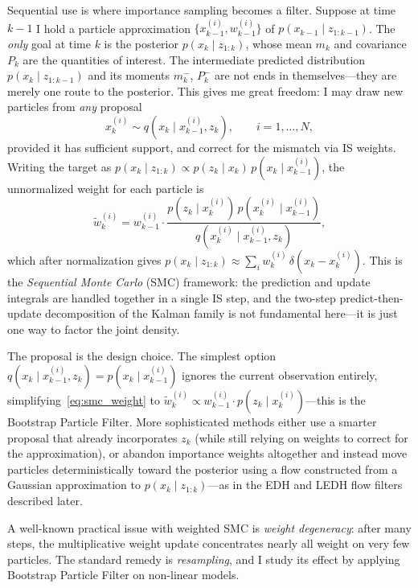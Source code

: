 \documentclass{article}
\begin{document}
Sequential use is where importance sampling becomes a filter. Suppose at time $k-1$ I hold a particle approximation $\{x_{k-1}^{(i)}, w_{k-1}^{(i)}\}$ of $p(x_{k-1} \mid z_{1:k-1})$. The \textit{only} goal at time $k$ is the posterior $p(x_k \mid z_{1:k})$, whose mean $m_k$ and covariance $P_k$ are the quantities of interest. The intermediate predicted distribution $p(x_k \mid z_{1:k-1})$ and its moments $m_k^-$, $P_k^-$ are not ends in themselves—they are merely one route to the posterior. This gives me great freedom: I may draw new particles from \textit{any} proposal
\begin{equation}
    x_k^{(i)} \sim q(x_k \mid x_{k-1}^{(i)}, z_k), \qquad i = 1, \ldots, N,
\end{equation}
provided it has sufficient support, and correct for the mismatch via IS weights. Writing the target as $p(x_k \mid z_{1:k}) \propto p(z_k \mid x_k)\, p(x_k \mid x_{k-1}^{(i)})$, the unnormalized weight for each particle is
\begin{equation}
    \tilde{w}_k^{(i)} = w_{k-1}^{(i)} \cdot \frac{p(z_k \mid x_k^{(i)})\, p(x_k^{(i)} \mid x_{k-1}^{(i)})}{q(x_k^{(i)} \mid x_{k-1}^{(i)}, z_k)},
    \label{eq:smc_weight}
\end{equation}
which after normalization gives $p(x_k \mid z_{1:k}) \approx \sum_i w_k^{(i)}\, \delta(x_k - x_k^{(i)})$. This is the \textit{Sequential Monte Carlo} (SMC) framework: the prediction and update integrals are handled together in a single IS step, and the two-step predict-then-update decomposition of the Kalman family is not fundamental here—it is just one way to factor the joint density.

The proposal is the design choice. The simplest option $q(x_k \mid x_{k-1}^{(i)}, z_k) = p(x_k \mid x_{k-1}^{(i)})$ ignores the current observation entirely, simplifying~\eqref{eq:smc_weight} to $\tilde{w}_k^{(i)} \propto w_{k-1}^{(i)} \cdot p(z_k \mid x_k^{(i)})$—this is the Bootstrap Particle Filter. More sophisticated methods either use a smarter proposal that already incorporates $z_k$ (while still relying on weights to correct for the approximation), or abandon importance weights altogether and instead move particles deterministically toward the posterior using a flow constructed from a Gaussian approximation to $p(x_k \mid z_{1:k})$—as in the EDH and LEDH flow filters described later.

A well-known practical issue with weighted SMC is \textit{weight degeneracy}: after many steps, the multiplicative weight update concentrates nearly all weight on very few particles. The standard remedy is \textit{resampling}, and I study its effect by applying Bootstrap Particle Filter on non-linear models.
\end{document}
